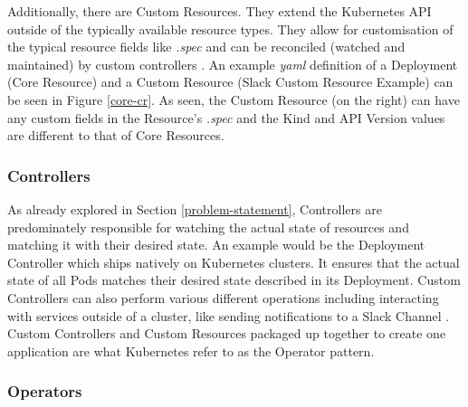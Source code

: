 \documentclass{article}
\begin{document}
Additionally, there are Custom Resources. They extend the Kubernetes API outside of the typically available resource types. They allow for customisation of the typical resource fields like \emph{.spec} and can be reconciled (watched and maintained) by custom controllers \cite{cust-res}. An example \emph{yaml} definition of a Deployment (Core Resource) and a Custom Resource (Slack Custom Resource Example) can be seen in Figure \ref{core-cr}. As seen, the Custom Resource (on the right) can have any custom fields in the Resource's \emph{.spec} and the Kind and API Version values are different to that of Core Resources.



\subsubsection{Controllers} \label{controllers}

As already explored in Section \ref{problem-statement}, Controllers are predominately responsible for watching the actual state of resources and matching it with their desired state. An example would be the Deployment Controller which ships natively on Kubernetes clusters. It ensures that the actual state of all Pods matches their desired state described in its Deployment. Custom Controllers can also perform various different operations including interacting with services outside of a cluster, like sending notifications to a Slack Channel \cite{ctrlrs-ref}. Custom Controllers and Custom Resources packaged up together to create one application are what Kubernetes refer to as the Operator pattern.


\subsubsection{Operators}
\end{document}
